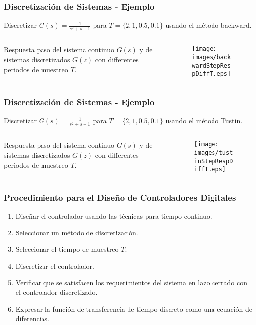 \documentclass[aspectratio=169]{beamer}
\theoremstyle{definition}
\theoremstyle{plain}
\theoremstyle{remark}
\begin{document}
\begin{frame}[c]\frametitle{Discretización de Sistemas - Ejemplo}
	\vspace*{3mm}	
	Discretizar $G(s) = \frac{1}{s^2 + s + 1}$ para $T = \{2,1,0.5,0.1\}$ usando el método backward.\\
	\begin{columns}
		\begin{column}{0.3\textwidth}
			Respuesta paso del sistema continuo $G(s)$ y de sistemas discretizados $G(z)$ con differentes periodos de muestreo $T$.
		\end{column}
		\begin{column}{0.7\textwidth}
			\begin{figure}
				\centering
				\texttt{[image: images/backwardStepRespDiffT.eps]}
			\end{figure}
		\end{column}
	\end{columns}
\end{frame}

\begin{frame}[c]\frametitle{Discretización de Sistemas - Ejemplo}
	\vspace*{3mm}	
	Discretizar $G(s) = \frac{1}{s^2 + s + 1}$ para $T = \{2,1,0.5,0.1\}$ usando el método Tustin.\\
	\begin{columns}
		\begin{column}{0.3\textwidth}			
			Respuesta paso del sistema continuo $G(s)$ y de sistemas discretizados $G(z)$ con differentes periodos de muestreo $T$.
		\end{column}
		\begin{column}{0.7\textwidth}
			\begin{figure}
				\centering
				\texttt{[image: images/tustinStepRespDiffT.eps]}
			\end{figure}
		\end{column}
	\end{columns}
\end{frame}

\begin{frame}[<+->]\frametitle{Procedimiento para el Diseño de Controladores Digitales}
	\begin{enumerate}
		\item Diseñar el controlador usando las técnicas para tiempo continuo.
		\item Seleccionar un método de discretización.
		\item Seleccionar el tiempo de muestreo $T$.
		\item Discretizar el controlador.
		\item Verificar que se satisfacen los requerimientos del sistema en lazo cerrado con el controlador discretizado.
		\item Expresar la función de transferencia de tiempo discreto como una ecuación de diferencias.
	\end{enumerate}
\end{frame}
\end{document}
